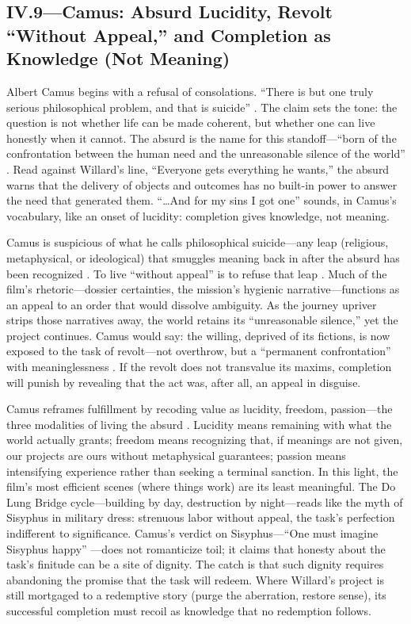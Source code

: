 \subsection*{IV.9—Camus: Absurd Lucidity, Revolt ``Without Appeal,'' and Completion as Knowledge
	(Not Meaning)}
\label{ssec:iii-camus}
Albert Camus begins with a refusal of consolations. ``There is but one truly serious philosophical
problem, and that is suicide'' \parencite[p.~3]{CamusMyth1991}. The claim sets the tone: the
question is not whether life can be made coherent, but whether one can live honestly when it
cannot. The absurd is the name for this standoff—``born of the confrontation between the human
need and the unreasonable silence of the world'' \parencite[p.~28]{CamusMyth1991}. Read against
Willard's line, ``Everyone gets everything he wants,'' the absurd warns that the delivery of
objects and outcomes has no built-in power to answer the need that generated them. ``\ldots And
for my sins I got one'' sounds, in Camus's vocabulary, like an onset of lucidity: completion
gives knowledge, not meaning.

Camus is suspicious of what he calls philosophical suicide—any leap (religious, metaphysical,
or ideological) that smuggles meaning back in after the absurd has been recognized
\parencite[pp.~53--58]{CamusMyth1991}. To live ``without appeal'' is to refuse that leap
\parencite[p.~54]{CamusMyth1991}. Much of the film's rhetoric—dossier certainties, the mission's
hygienic narrative—functions as an appeal to an order that would dissolve ambiguity. As the
journey upriver strips those narratives away, the world retains its ``unreasonable silence,''
yet the project continues. Camus would say: the willing, deprived of its fictions, is now
exposed to the task of revolt—not overthrow, but a ``permanent confrontation'' with
meaninglessness \parencite[p.~55]{CamusMyth1991}. If the revolt does not transvalue its maxims,
completion will punish by revealing that the act was, after all, an appeal in disguise.

Camus reframes fulfillment by recoding value as lucidity, freedom, passion—the three modalities
of living the absurd \parencite[pp.~54--71]{CamusMyth1991}. Lucidity means remaining with what
the world actually grants; freedom means recognizing that, if meanings are not given, our
projects are ours without metaphysical guarantees; passion means intensifying experience rather
than seeking a terminal sanction. In this light, the film's most efficient scenes (where things
work) are its least meaningful. The Do Lung Bridge cycle—building by day, destruction by
night—reads like the myth of Sisyphus in military dress: strenuous labor without appeal, the
task's perfection indifferent to significance. Camus's verdict on Sisyphus—``One must imagine
Sisyphus happy'' \parencite[p.~123]{CamusMyth1991}—does not romanticize toil; it claims that
honesty about the task's finitude can be a site of dignity. The catch is that such dignity
requires abandoning the promise that the task will redeem. Where Willard's project is still
mortgaged to a redemptive story (purge the aberration, restore sense), its successful completion
must recoil as knowledge that no redemption follows.

